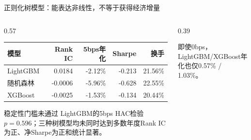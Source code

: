 \documentclass[aspectratio=169,10pt]{beamer}
\begin{document}
\begin{frame}{正则化树模型：能表达非线性，不等于获得经济增量}
  \begin{columns}[T,onlytextwidth]
    \begin{column}{0.57\textwidth}
      \small
      \begin{tabular}{lrrrr}
        \toprule
        模型 & Rank IC & 5bps年化 & Sharpe & 换手 \\
        \midrule
        LightGBM & 0.0184 & -2.12\% & -0.213 & 21.56\% \\
        随机森林 & -0.0006 & -5.96\% & -0.628 & 22.55\% \\
        XGBoost & -0.0025 & -1.53\% & -0.134 & 20.44\% \\
        \bottomrule
      \end{tabular}
      \medskip
      \begin{alertblock}{稳定性门槛未通过}
        LightGBM的5bps HAC检验 $p=0.596$；三种树模型均未同时达到多数年度Rank IC为正、净Sharpe为正和统计显著。
      \end{alertblock}
    \end{column}
    \begin{column}{0.39\textwidth}
      \centering
      \scriptsize 即使0bps，LightGBM/XGBoost年化也仅0.57\% / 1.03\%。
    \end{column}
  \end{columns}
\end{frame}
\end{document}

